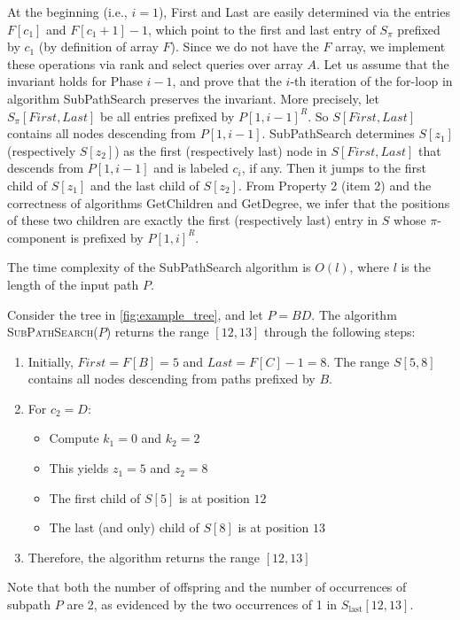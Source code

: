At the beginning (i.e., $i = 1$), First and Last are easily determined via the entries $F[c_1]$ and $F[c_1 + 1] - 1$, which point to the first and last entry of $S_{\pi}$ prefixed by $c_1$ (by definition of array $F$). Since we do not have the $F$ array, we implement these operations via rank and select queries over array $A$. Let us assume that the invariant holds for Phase $i - 1$, and prove that the $i$-th iteration of the for-loop in algorithm SubPathSearch preserves the invariant. More precisely, let $S_{\pi}[First, Last]$ be all entries prefixed by $P[1, i - 1]^R$. So $S[First, Last]$ contains all nodes descending from $P[1, i - 1]$. SubPathSearch determines $S[z_1]$ (respectively $S[z_2]$) as the first (respectively last) node in $S[First, Last]$ that descends from $P[1, i - 1]$ and is labeled $c_i$, if any. Then it jumps to the first child of $S[z_1]$ and the last child of $S[z_2]$. From Property 2 (item 2) and the correctness of algorithms GetChildren and GetDegree, we infer that the positions of these two children are exactly the first (respectively last) entry in $S$ whose $\pi$-component is prefixed by $P[1, i]^R$. 

The time complexity of the SubPathSearch algorithm is $O(l)$, where $l$ is the length of the input path $P$.

\begin{example}
    Consider the tree in \cref{fig:example_tree}, and let $P = BD$. The algorithm \textsc{SubPathSearch}($P$) returns the range $[12, 13]$ through the following steps:

    \begin{enumerate}
        \item Initially, $First = F[B] = 5$ and $Last = F[C] - 1 = 8$. The range $S[5,8]$ contains all nodes descending from paths prefixed by $B$.
        
        \item For $c_2 = D$:
        \begin{itemize}
            \item Compute $k_1 = 0$ and $k_2 = 2$
            \item This yields $z_1 = 5$ and $z_2 = 8$
            \item The first child of $S[5]$ is at position $12$
            \item The last (and only) child of $S[8]$ is at position $13$
        \end{itemize}
        
        \item Therefore, the algorithm returns the range $[12,13]$
    \end{enumerate}

    Note that both the number of offspring and the number of occurrences of subpath $P$ are 2, as evidenced by the two occurrences of 1 in $S_{\text{last}}[12,13]$.
\end{example}

